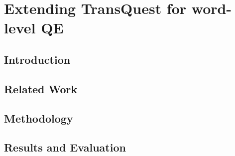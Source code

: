 \chapter{\label{cha:transquest_word}Extending TransQuest for word-level QE}

\section{Introduction}


\section{Related Work}
\cite{logacheva-etal-2016-marmot}
\section{Methodology}

\section{Results and Evaluation}

